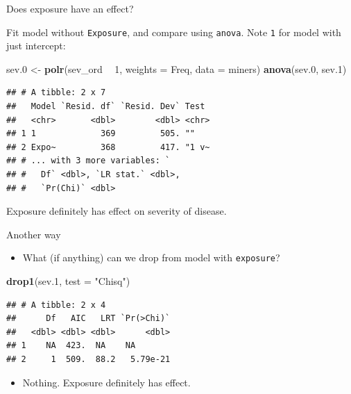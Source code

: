 \documentclass[
  ignorenonframetext,
]{beamer}
\newenvironment{Shaded}{\begin{snugshade}}{\end{snugshade}}
\newcommand{\DataTypeTok}[1]{\textcolor[rgb]{0.13,0.29,0.53}{#1}}
\newcommand{\DecValTok}[1]{\textcolor[rgb]{0.00,0.00,0.81}{#1}}
\newcommand{\FloatTok}[1]{\textcolor[rgb]{0.00,0.00,0.81}{#1}}
\newcommand{\KeywordTok}[1]{\textcolor[rgb]{0.13,0.29,0.53}{\textbf{#1}}}
\newcommand{\NormalTok}[1]{#1}
\newcommand{\OperatorTok}[1]{\textcolor[rgb]{0.81,0.36,0.00}{\textbf{#1}}}
\newcommand{\StringTok}[1]{\textcolor[rgb]{0.31,0.60,0.02}{#1}}
\providecommand{\tightlist}{%
  \setlength{\itemsep}{0pt}\setlength{\parskip}{0pt}}
\begin{document}
\begin{frame}[fragile]{Does exposure have an effect?}
\protect\hypertarget{does-exposure-have-an-effect}{}

Fit model without \texttt{Exposure}, and compare using \texttt{anova}.
Note \texttt{1} for model with just intercept:

\small

\begin{Shaded}
\begin{Highlighting}[]
\NormalTok{sev}\FloatTok{.0}\NormalTok{ <-}\StringTok{ }\KeywordTok{polr}\NormalTok{(sev_ord }\OperatorTok{~}\StringTok{ }\DecValTok{1}\NormalTok{, }\DataTypeTok{weights =}\NormalTok{ Freq, }\DataTypeTok{data =}\NormalTok{ miners)}
\KeywordTok{anova}\NormalTok{(sev}\FloatTok{.0}\NormalTok{, sev}\FloatTok{.1}\NormalTok{)}
\end{Highlighting}
\end{Shaded}

\begin{verbatim}
## # A tibble: 2 x 7
##   Model `Resid. df` `Resid. Dev` Test 
##   <chr>       <dbl>        <dbl> <chr>
## 1 1             369         505. ""   
## 2 Expo~         368         417. "1 v~
## # ... with 3 more variables: `
## #   Df` <dbl>, `LR stat.` <dbl>,
## #   `Pr(Chi)` <dbl>
\end{verbatim}

\normalsize

Exposure definitely has effect on severity of disease.

\end{frame}

\begin{frame}[fragile]{Another way}
\protect\hypertarget{another-way}{}

\begin{itemize}
\tightlist
\item
  What (if anything) can we drop from model with \texttt{exposure}?
\end{itemize}

\begin{Shaded}
\begin{Highlighting}[]
\KeywordTok{drop1}\NormalTok{(sev}\FloatTok{.1}\NormalTok{, }\DataTypeTok{test =} \StringTok{"Chisq"}\NormalTok{)}
\end{Highlighting}
\end{Shaded}

\begin{verbatim}
## # A tibble: 2 x 4
##      Df   AIC   LRT `Pr(>Chi)`
##   <dbl> <dbl> <dbl>      <dbl>
## 1    NA  423.  NA    NA       
## 2     1  509.  88.2   5.79e-21
\end{verbatim}

\begin{itemize}
\tightlist
\item
  Nothing. Exposure definitely has effect.
\end{itemize}

\end{frame}
\end{document}
